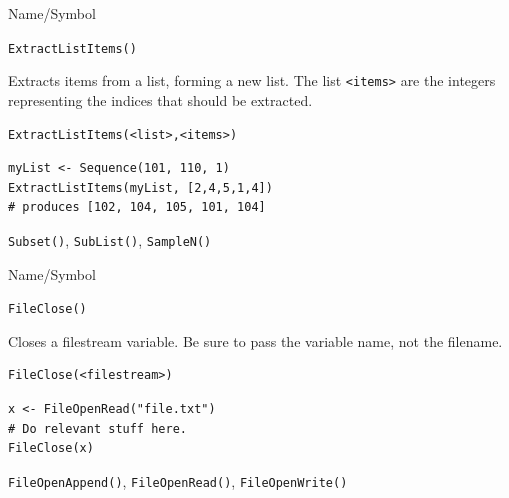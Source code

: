 \begin{desc}{Name/Symbol}
\item[Name/Symbol]	\verb+ExtractListItems()+

\item[Description]	Extracts items from a list, forming a new list. 
		The list \verb+<items>+ are the integers representing the
		indices that should be extracted.  
	     
\item[Usage]
\begin{verbatim}
ExtractListItems(<list>,<items>)
\end{verbatim}

\item[Example]
\begin{verbatim}
myList <- Sequence(101, 110, 1)
ExtractListItems(myList, [2,4,5,1,4])
# produces [102, 104, 105, 101, 104]
\end{verbatim}

\item[See Also]	\verb+Subset()+, \verb+SubList()+, \verb+SampleN()+
\end{desc}

\vfill
\newpage
{}
\vfill


\begin{desc}{Name/Symbol}
\item[Name/Symbol]	\verb+FileClose()+

\item[Description]	Closes a filestream  variable.  Be sure to 
		pass the variable name, not the filename.  

\item[Usage]
\begin{verbatim}
FileClose(<filestream>)
\end{verbatim}

\item[Example]
\begin{verbatim}
x <- FileOpenRead("file.txt")
# Do relevant stuff here.
FileClose(x)
\end{verbatim}

\item[See Also]	\verb+FileOpenAppend()+, \verb+FileOpenRead()+, \verb+FileOpenWrite()+

\end{desc}



